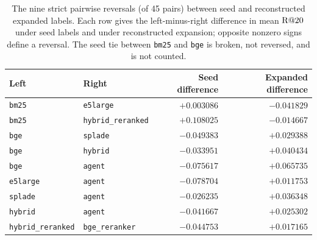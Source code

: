 \begin{table}[h]
\centering
\small
\caption{The nine strict pairwise reversals (of 45 pairs) between seed and reconstructed expanded labels. Each row gives the left-minus-right difference in mean $\mathrm{R}@20$ under seed labels and under reconstructed expansion; opposite nonzero signs define a reversal. The seed tie between \texttt{bm25} and \texttt{bge} is broken, not reversed, and is not counted.}
\label{tab:reversals}
\begin{tabular}{@{}llrr@{}}
\toprule
Left & Right & Seed difference & Expanded difference \\
\midrule
\texttt{bm25} & \texttt{e5large} & $+0.003086$ & $-0.041829$ \\
\texttt{bm25} & \texttt{hybrid\_reranked} & $+0.108025$ & $-0.014667$ \\
\texttt{bge} & \texttt{splade} & $-0.049383$ & $+0.029388$ \\
\texttt{bge} & \texttt{hybrid} & $-0.033951$ & $+0.040434$ \\
\texttt{bge} & \texttt{agent} & $-0.075617$ & $+0.065735$ \\
\texttt{e5large} & \texttt{agent} & $-0.078704$ & $+0.011753$ \\
\texttt{splade} & \texttt{agent} & $-0.026235$ & $+0.036348$ \\
\texttt{hybrid} & \texttt{agent} & $-0.041667$ & $+0.025302$ \\
\texttt{hybrid\_reranked} & \texttt{bge\_reranker} & $-0.044753$ & $+0.017165$ \\
\bottomrule
\end{tabular}
\end{table}

